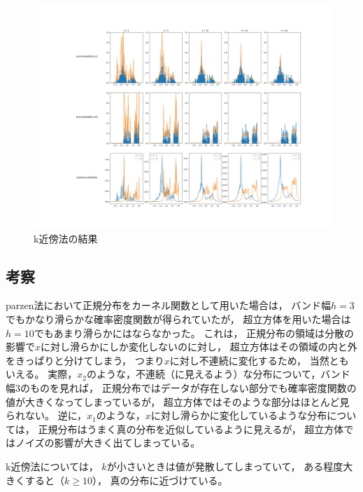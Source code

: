 \documentclass[class=jsarticle, crop=false, dvipdfmx, fleqn]{standalone}
\begin{document}
\begin{figure}
    \centering
    \includegraphics[clip, width=18cm, trim=200 72 0 0]{../figures/kmeans_result}
    \caption{k近傍法の結果}
    \label{fig:kmeans_result}
\end{figure}



\subsection*{考察}

parzen法において正規分布をカーネル関数として用いた場合は，
バンド幅\(h = 3\)でもかなり滑らかな確率密度関数が得られていたが，
超立方体を用いた場合は\(h = 10\)でもあまり滑らかにはならなかった。
これは，
正規分布の領域は分散の影響で\(x\)に対し滑らかにしか変化しないのに対し，
超立方体はその領域の内と外をきっぱりと分けてしまう，
つまり\(x\)に対し不連続に変化するため，
当然ともいえる。
実際，\(x_2\)のような，不連続（に見えるよう）な分布について，バンド幅3のものを見れば，
正規分布ではデータが存在しない部分でも確率密度関数の値が大きくなってしまっているが，
超立方体ではそのような部分はほとんど見られない。
逆に，\(x_1\)のような，\(x\)に対し滑らかに変化しているような分布については，
正規分布はうまく真の分布を近似しているように見えるが，
超立方体ではノイズの影響が大きく出てしまっている。

k近傍法については，
\(k\)が小さいときは値が発散してしまっていて，
ある程度大きくすると（\(k \ge 10\)），
真の分布に近づけている。
\end{document}
